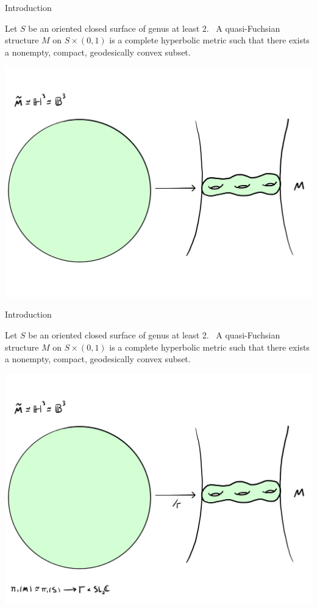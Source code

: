 \documentclass[professionalfont]{beamer}
\begin{document}
\begin{frame}{Introduction}

Let $S$ be an oriented closed surface of genus at least 2.  \ A quasi-Fuchsian structure $M$ on $S \times (0,1)$ is a complete hyperbolic metric such that there exists a nonempty, compact, geodesically convex subset.


\centering\includegraphics[scale=0.09]{QF-2.jpg}
	


\end{frame}





\begin{frame}{Introduction}

Let $S$ be an oriented closed surface of genus at least 2.  \ A quasi-Fuchsian structure $M$ on $S \times (0,1)$ is a complete hyperbolic metric such that there exists a nonempty, compact, geodesically convex subset.


\centering\includegraphics[scale=0.09]{QF-3.jpg}
	


\end{frame}
\end{document}
